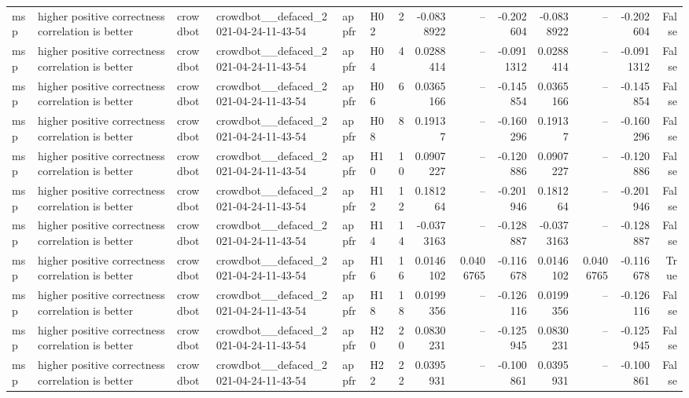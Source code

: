 \begin{longtable}{llllllrrrrrrrr}
msp & higher positive correctness correlation is better & crowdbot & crowdbot\_\_defaced\_2021-04-24-11-43-54 & appfr & H02 & 2 & -0.0838922 & -- & -0.202604 & -0.0838922 & -- & -0.202604 & False \\
msp & higher positive correctness correlation is better & crowdbot & crowdbot\_\_defaced\_2021-04-24-11-43-54 & appfr & H04 & 4 & 0.0288414 & -- & -0.0911312 & 0.0288414 & -- & -0.0911312 & False \\
msp & higher positive correctness correlation is better & crowdbot & crowdbot\_\_defaced\_2021-04-24-11-43-54 & appfr & H06 & 6 & 0.0365166 & -- & -0.145854 & 0.0365166 & -- & -0.145854 & False \\
msp & higher positive correctness correlation is better & crowdbot & crowdbot\_\_defaced\_2021-04-24-11-43-54 & appfr & H08 & 8 & 0.19137 & -- & -0.160296 & 0.19137 & -- & -0.160296 & False \\
msp & higher positive correctness correlation is better & crowdbot & crowdbot\_\_defaced\_2021-04-24-11-43-54 & appfr & H10 & 10 & 0.0907227 & -- & -0.120886 & 0.0907227 & -- & -0.120886 & False \\
msp & higher positive correctness correlation is better & crowdbot & crowdbot\_\_defaced\_2021-04-24-11-43-54 & appfr & H12 & 12 & 0.181264 & -- & -0.201946 & 0.181264 & -- & -0.201946 & False \\
msp & higher positive correctness correlation is better & crowdbot & crowdbot\_\_defaced\_2021-04-24-11-43-54 & appfr & H14 & 14 & -0.0373163 & -- & -0.128887 & -0.0373163 & -- & -0.128887 & False \\
msp & higher positive correctness correlation is better & crowdbot & crowdbot\_\_defaced\_2021-04-24-11-43-54 & appfr & H16 & 16 & 0.0146102 & 0.0406765 & -0.116678 & 0.0146102 & 0.0406765 & -0.116678 & True \\
msp & higher positive correctness correlation is better & crowdbot & crowdbot\_\_defaced\_2021-04-24-11-43-54 & appfr & H18 & 18 & 0.0199356 & -- & -0.126116 & 0.0199356 & -- & -0.126116 & False \\
msp & higher positive correctness correlation is better & crowdbot & crowdbot\_\_defaced\_2021-04-24-11-43-54 & appfr & H20 & 20 & 0.0830231 & -- & -0.125945 & 0.0830231 & -- & -0.125945 & False \\
msp & higher positive correctness correlation is better & crowdbot & crowdbot\_\_defaced\_2021-04-24-11-43-54 & appfr & H22 & 22 & 0.0395931 & -- & -0.100861 & 0.0395931 & -- & -0.100861 & False \\

\end{longtable}

